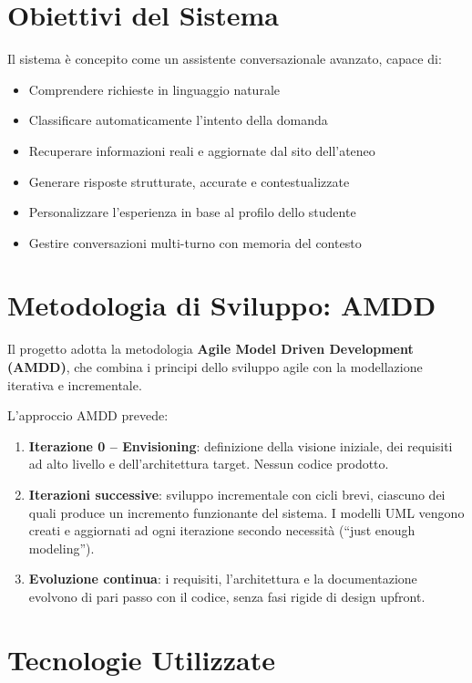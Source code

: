 \documentclass[a4paper,12pt]{report}
\begin{document}
\section{Obiettivi del Sistema}

Il sistema è concepito come un assistente conversazionale avanzato, capace di:
\begin{itemize}
    \item Comprendere richieste in linguaggio naturale
    \item Classificare automaticamente l'intento della domanda
    \item Recuperare informazioni reali e aggiornate dal sito dell'ateneo
    \item Generare risposte strutturate, accurate e contestualizzate
    \item Personalizzare l'esperienza in base al profilo dello studente
    \item Gestire conversazioni multi-turno con memoria del contesto
\end{itemize}

\section{Metodologia di Sviluppo: AMDD}

Il progetto adotta la metodologia \textbf{Agile Model Driven Development (AMDD)}, che combina i principi dello sviluppo agile con la modellazione iterativa e incrementale.

L'approccio AMDD prevede:
\begin{enumerate}
    \item \textbf{Iterazione 0 -- Envisioning}: definizione della visione iniziale, dei requisiti ad alto livello e dell'architettura target. Nessun codice prodotto.
    \item \textbf{Iterazioni successive}: sviluppo incrementale con cicli brevi, ciascuno dei quali produce un incremento funzionante del sistema. I modelli UML vengono creati e aggiornati ad ogni iterazione secondo necessità (``just enough modeling'').
    \item \textbf{Evoluzione continua}: i requisiti, l'architettura e la documentazione evolvono di pari passo con il codice, senza fasi rigide di design upfront.
\end{enumerate}

\section{Tecnologie Utilizzate}
\end{document}
